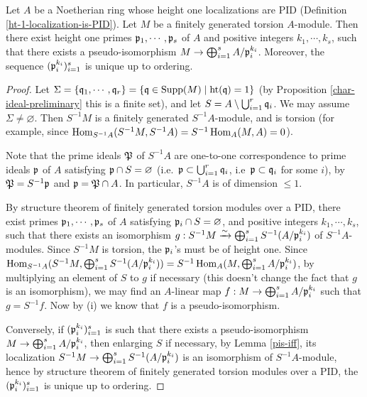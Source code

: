 \begin{prop}
\label{structure-thm}
\leanok
Let $A$ be a Noetherian ring whose height one localizations are PID
(Definition \ref{ht-1-localization-is-PID}).
Let $M$ be a finitely generated torsion $A$-module.
Then there exist height one primes ${\mathfrak{p}}_1,\cdots,{\mathfrak{p}}_s$ of $A$
and positive integers $k_1,\cdots,k_s$, such that there exists a pseudo-isomorphism
$M\to\bigoplus_{i=1}^s A/{\mathfrak{p}}_i^{k_i}$.
Moreover, the sequence $({\mathfrak{p}}_i^{k_i})_{i=1}^s$ is unique up to ordering.
\end{prop}

\begin{proof}
Let
$\Sigma=\{{\mathfrak{q}}_1,\cdots,{\mathfrak{q}}_r\}=\{{\mathfrak{q}}\in{\mathrm{Supp}}(M)\mid{\mathrm{ht}}({\mathfrak{q}})=1\}$
(by Proposition \ref{char-ideal-preliminary} this is a finite set),
and let $S=A\setminus\bigcup_{i=1}^r{\mathfrak{q}}_i$.
We may assume $\Sigma\neq\varnothing$.
Then $S^{-1}M$ is a finitely generated $S^{-1}A$-module,
and is torsion (for example, since $\operatorname{Hom}_{S^{-1}A}(S^{-1}M,S^{-1}A)
=S^{-1}\operatorname{Hom}_A(M,A)=0$).

Note that the prime ideals ${\mathfrak{P}}$ of $S^{-1}A$ are one-to-one correspondence
to prime ideals ${\mathfrak{p}}$ of $A$ satisfying ${\mathfrak{p}}\cap S=\varnothing$
(i.e.~${\mathfrak{p}}\subset\bigcup_{i=1}^r{\mathfrak{q}}_i$, i.e~${\mathfrak{p}}\subset{\mathfrak{q}}_i$ for some $i$),
by ${\mathfrak{P}}=S^{-1}{\mathfrak{p}}$ and ${\mathfrak{p}}={\mathfrak{P}}\cap A$.
In particular, $S^{-1}A$ is of dimension $\leq 1$.

By structure theorem of finitely generated torsion modules over a PID,
there exist primes ${\mathfrak{p}}_1,\cdots,{\mathfrak{p}}_s$ of $A$
satisfying ${\mathfrak{p}}_i\cap S=\varnothing$,
and positive integers $k_1,\cdots,k_s$, such that
there exists an isomorphism
$g:S^{-1}M\xrightarrow\sim\bigoplus_{i=1}^sS^{-1}(A/{\mathfrak{p}}_i^{k_i})$
of $S^{-1}A$-modules.
Since $S^{-1}M$ is torsion, the ${\mathfrak{p}}_i$'s must be of height one.
Since $\operatorname{Hom}_{S^{-1}A}(S^{-1}M,\bigoplus_{i=1}^sS^{-1}(A/{\mathfrak{p}}_i^{k_i}))
=S^{-1}\operatorname{Hom}_A(M,\bigoplus_{i=1}^sA/{\mathfrak{p}}_i^{k_i})$,
by multiplying an element of $S$ to $g$ if necessary
(this doesn't change the fact that $g$ is an isomorphism), we may find
an $A$-linear map $f:M\to\bigoplus_{i=1}^sA/{\mathfrak{p}}_i^{k_i}$
such that $g=S^{-1}f$.
Now by (i) we know that $f$ is a pseudo-isomorphism.

Conversely, if $({\mathfrak{p}}_i^{k_i})_{i=1}^s$ is such that there exists a
pseudo-isomorphism
$M\to\bigoplus_{i=1}^s A/{\mathfrak{p}}_i^{k_i}$,
then enlarging $S$ if necessary, by Lemma \ref{pis-iff},
its localization
$S^{-1}M\to\bigoplus_{i=1}^sS^{-1}(A/{\mathfrak{p}}_i^{k_i})$
is an isomorphism of $S^{-1}A$-module, hence by
structure theorem of finitely generated torsion modules over a PID,
the $({\mathfrak{p}}_i^{k_i})_{i=1}^s$ is unique up to ordering.
\end{proof}

